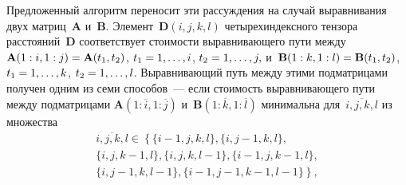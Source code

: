 \begin{multicols}{2}
Предложенный алгоритм переносит эти рас\-суж\-де\-ния на случай 
выравнивания двух матриц~$\textbf{A}$ и~$\textbf{B}$. 
Элемент~$\boldsymbol{D}(i,j,k,l)$ четырехиндексного
 тензора расстояний~$\boldsymbol{D}$ соответствует стоимости выравнивающего 
 пути между $\textbf{A}(1:i,1:j) \hm= \textbf{A}(t_1,t_2)$, 
 $t_1 \hm= 1,\ldots, i$, $t_2 \hm= 1,\ldots, j,$ 
 и~$\textbf{B}(1:k,1:l) \hm= \textbf{B}(t_1,t_2)$, $t_1 \hm= 1,\ldots, k$,
 $t_2 \hm= 1,\ldots, l$. Выравнивающий путь между этими 
 подматрицами получен одним из семи способов~--- 
 если стоимость выравнивающего пути между 
 подматрицами $\textbf{A}(1:\overline{i},1:\overline{j})$ 
 и~$\textbf{B}(1:\overline{k},1:\overline{l})$ 
 минимальна для~$\overline{i,j,k,l}$ из множества
\begin{multline*} 
\overline{i,j,k,l} \in 
\left\{ \{i-1,j,k,l\},\{i,j-1,k,l\},\right.\\
\{i,j,k-1,l\},
\{i,j,k,l-1\}, \{i-1,j,k-1,l\},\\
\left.
\{i,j-1,k,l-1\},\{i-1,j-1,k-1,l-1\}\right\},
\end{multline*}


\end{multicols}
